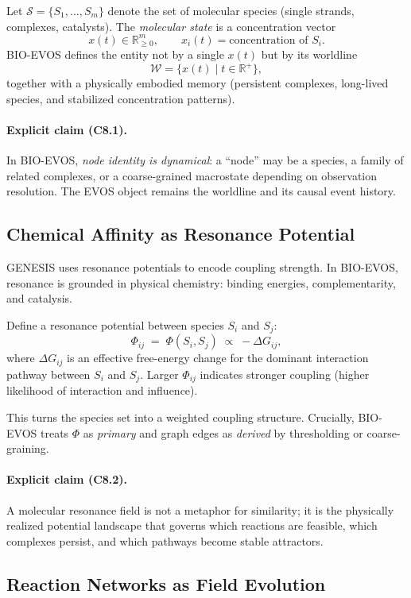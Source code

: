 \documentclass[11pt]{article}
\begin{document}
Let $\mathcal{S}=\{S_1,\dots,S_m\}$ denote the set of molecular species (single strands,
complexes, catalysts). The \emph{molecular state} is a concentration vector
\[
x(t)\in \mathbb{R}_{\ge 0}^m,\qquad x_i(t)=\text{concentration of } S_i.
\]
BIO-EVOS defines the entity not by a single $x(t)$ but by its worldline
\[
\mathcal{W}=\{x(t)\mid t\in \mathbb{R}^+\},
\]
together with a physically embodied memory (persistent complexes, long-lived species,
and stabilized concentration patterns).

\paragraph{Explicit claim (C8.1).}
In BIO-EVOS, \emph{node identity is dynamical}: a ``node'' may be a species, a family of
related complexes, or a coarse-grained macrostate depending on observation resolution.
The EVOS object remains the worldline and its causal event history.

\subsection{Chemical Affinity as Resonance Potential}
\label{sec:affinity-potential}

GENESIS uses resonance potentials to encode coupling strength. In BIO-EVOS, resonance
is grounded in physical chemistry: binding energies, complementarity, and catalysis.

Define a resonance potential between species $S_i$ and $S_j$:
\[
\Phi_{ij}\;=\;\Phi(S_i,S_j)\;\propto\;-\Delta G_{ij},
\]
where $\Delta G_{ij}$ is an effective free-energy change for the dominant interaction
pathway between $S_i$ and $S_j$. Larger $\Phi_{ij}$ indicates stronger coupling (higher
likelihood of interaction and influence).

This turns the species set into a weighted coupling structure. Crucially, BIO-EVOS treats
$\Phi$ as \emph{primary} and graph edges as \emph{derived} by thresholding or coarse-graining.

\paragraph{Explicit claim (C8.2).}
A molecular resonance field is not a metaphor for similarity; it is the physically
realized potential landscape that governs which reactions are feasible, which complexes
persist, and which pathways become stable attractors.

\subsection{Reaction Networks as Field Evolution}
\label{sec:reaction-networks-field}
\end{document}
